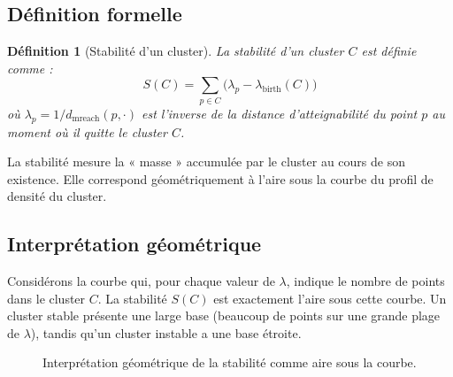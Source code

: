 \documentclass[11pt,a4paper]{article}
\newtheorem{definition}{Définition}[section]
\begin{document}
\subsection{Définition formelle}

\begin{definition}[Stabilité d'un cluster]
La \textit{stabilité} d'un cluster $C$ est définie comme :
\begin{equation}
\boxed{S(C) = \sum_{p \in C} \bigl(\lambda_p - \lambda_{\text{birth}}(C)\bigr)}
\end{equation}
où $\lambda_p = 1/d_{\text{mreach}}(p, \cdot)$ est l'inverse de la distance d'atteignabilité du point $p$ au moment où il quitte le cluster $C$.
\end{definition}

La stabilité mesure la « masse » accumulée par le cluster au cours de son existence. Elle correspond géométriquement à l'aire sous la courbe du profil de densité du cluster.

\subsection{Interprétation géométrique}

Considérons la courbe qui, pour chaque valeur de $\lambda$, indique le nombre de points dans le cluster $C$. La stabilité $S(C)$ est exactement l'aire sous cette courbe. Un cluster stable présente une large base (beaucoup de points sur une grande plage de $\lambda$), tandis qu'un cluster instable a une base étroite.

\begin{figure}[htbp]
\centering
{}
\caption{Interprétation géométrique de la stabilité comme aire sous la courbe.}
\label{fig:stability}
\end{figure}
\end{document}
